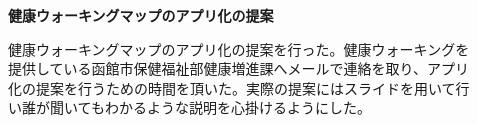 ﻿\begin{description}
 \item[]
  \textbf{健康ウォーキングマップのアプリ化の提案}\par
 健康ウォーキングマップのアプリ化の提案を行った。健康ウォーキングを提供している函館市保健福祉部健康増進課へメールで連絡を取り、アプリ化の提案を行うための時間を頂いた。実際の提案にはスライドを用いて行い誰が聞いてもわかるような説明を心掛けるようにした。
  \par
\end{description}
